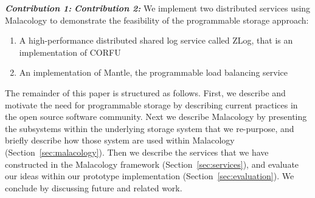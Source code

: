 {\it \textbf{Contribution 1:}} 
{\it \textbf{Contribution 2:}} We implement two distributed services using
Malacology to demonstrate the feasibility of the programmable storage approach:

\begin{enumerate}

\item A high-performance distributed shared log service called ZLog, that is an
implementation of CORFU~\cite{balakrishnan_corfu_2012}

\item An implementation of Mantle, the programmable load balancing
service~\cite{sevilla:sc15-mantle}

\end{enumerate}

The remainder of this paper is structured as follows. First, we describe and
motivate the need for programmable storage by describing current practices in
the open source software community. Next we describe Malacology by presenting
the subsystems within the underlying storage system that we re-purpose, and
briefly describe how those system are used within Malacology
(Section~\ref{sec:malacology}).  Then we describe the services that we have
constructed in the Malacology framework (Section~\ref{sec:services}), and
evaluate our ideas within our prototype implementation
(Section~\ref{sec:evaluation}).  We conclude by discussing future and related
work.
